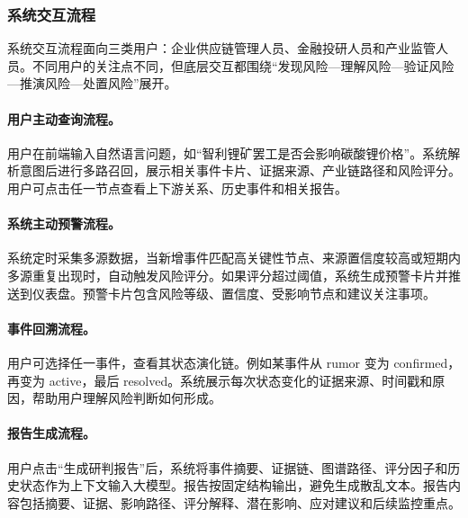 ﻿\documentclass[12pt,a4paper]{article}
\begin{document}
\subsubsection{系统交互流程}

系统交互流程面向三类用户：企业供应链管理人员、金融投研人员和产业监管人员。不同用户的关注点不同，但底层交互都围绕“发现风险—理解风险—验证风险—推演风险—处置风险”展开。

\paragraph{用户主动查询流程。}用户在前端输入自然语言问题，如“智利锂矿罢工是否会影响碳酸锂价格”。系统解析意图后进行多路召回，展示相关事件卡片、证据来源、产业链路径和风险评分。用户可点击任一节点查看上下游关系、历史事件和相关报告。

\paragraph{系统主动预警流程。}系统定时采集多源数据，当新增事件匹配高关键性节点、来源置信度较高或短期内多源重复出现时，自动触发风险评分。如果评分超过阈值，系统生成预警卡片并推送到仪表盘。预警卡片包含风险等级、置信度、受影响节点和建议关注事项。

\paragraph{事件回溯流程。}用户可选择任一事件，查看其状态演化链。例如某事件从 rumor 变为 confirmed，再变为 active，最后 resolved。系统展示每次状态变化的证据来源、时间戳和原因，帮助用户理解风险判断如何形成。

\paragraph{报告生成流程。}用户点击“生成研判报告”后，系统将事件摘要、证据链、图谱路径、评分因子和历史状态作为上下文输入大模型。报告按固定结构输出，避免生成散乱文本。报告内容包括摘要、证据、影响路径、评分解释、潜在影响、应对建议和后续监控重点。
\end{document}
